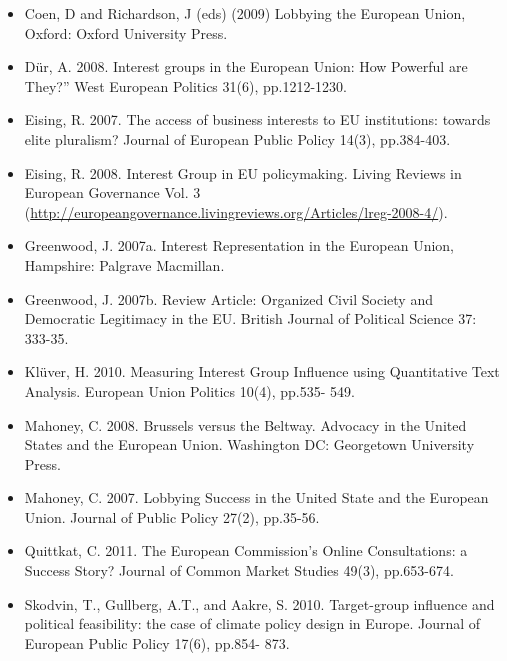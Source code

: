 \begin{itemize}
	\item Coen, D and Richardson, J (eds) (2009) Lobbying the European Union, Oxford: Oxford University Press.
	\item D{\"u}r, A. 2008. Interest groups in the European Union: How Powerful are They?” West European Politics 31(6), pp.1212-1230.
	\item Eising, R. 2007. The access of business interests to EU institutions: towards elite pluralism? Journal of European Public Policy 14(3), pp.384-403.
	\item Eising, R. 2008. Interest Group in EU policymaking. Living Reviews in European Governance Vol. 3 (\url{http://europeangovernance.livingreviews.org/Articles/lreg-2008-4/}).
	\item Greenwood, J. 2007a. Interest Representation in the European Union, Hampshire: Palgrave Macmillan.
	\item Greenwood, J. 2007b. Review Article: Organized Civil Society and Democratic Legitimacy in the EU. British Journal of Political Science 37: 333-35. 
	\item Kl{\"u}ver, H. 2010. Measuring Interest Group Influence using Quantitative Text Analysis. European Union Politics 10(4), pp.535- 549.
	\item Mahoney, C. 2008. Brussels versus the Beltway. Advocacy in the United States and the European Union. Washington DC: Georgetown University Press.
	\item Mahoney, C. 2007. Lobbying Success in the United State and the European Union. Journal of Public Policy 27(2), pp.35-56.
	\item Quittkat, C. 2011. The European Commission’s Online Consultations: a Success Story? Journal of Common Market Studies 49(3), pp.653-674.
	\item Skodvin, T., Gullberg, A.T., and Aakre, S. 2010. Target-group influence and political feasibility: the case of climate policy design in Europe. Journal of European Public Policy 17(6), pp.854- 873.
\end{itemize}